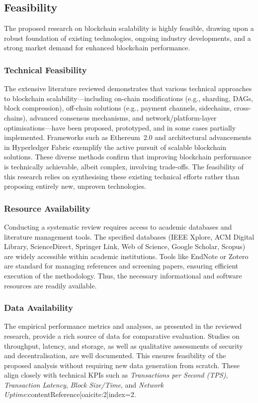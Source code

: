 \subsection{Feasibility}
\vspace{12pt}

The proposed research on blockchain scalability is highly feasible, drawing upon a robust foundation of existing technologies, ongoing industry developments, and a strong market demand for enhanced blockchain performance.

\subsubsection{Technical Feasibility}
The extensive literature reviewed demonstrates that various technical approaches to blockchain scalability---including on-chain modifications (e.g., sharding, DAGs, block compression), off-chain solutions (e.g., payment channels, sidechains, cross-chains), advanced consensus mechanisms, and network/platform-layer optimisations---have been proposed, prototyped, and in some cases partially implemented. Frameworks such as Ethereum~2.0 and architectural advancements in Hyperledger Fabric exemplify the active pursuit of scalable blockchain solutions. These diverse methods confirm that improving blockchain performance is technically achievable, albeit complex, involving trade-offs. The feasibility of this research relies on synthesising these existing technical efforts rather than proposing entirely new, unproven technologies.

\subsubsection{Resource Availability}
Conducting a systematic review requires access to academic databases and literature management tools. The specified databases (IEEE Xplore, ACM Digital Library, ScienceDirect, Springer Link, Web of Science, Google Scholar, Scopus) are widely accessible within academic institutions. Tools like EndNote or Zotero are standard for managing references and screening papers, ensuring efficient execution of the methodology. Thus, the necessary informational and software resources are readily available.

\subsubsection{Data Availability}
The empirical performance metrics and analyses, as presented in the reviewed research, provide a rich source of data for comparative evaluation. Studies on throughput, latency, and storage, as well as qualitative assessments of security and decentralisation, are well documented. This ensures feasibility of the proposed analysis without requiring new data generation from scratch. These align closely with technical KPIs such as \textit{Transactions per Second (TPS)}, \textit{Transaction Latency}, \textit{Block Size/Time}, and \textit{Network Uptime}:contentReference[oaicite:2]{index=2}.

